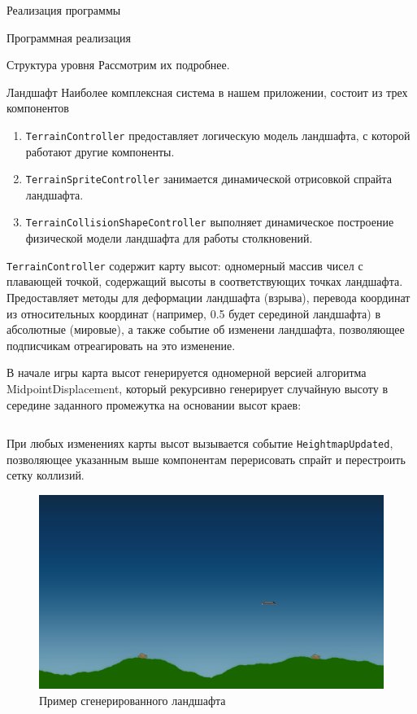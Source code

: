 \documentclass[a4paper, 14pt]{extarticle}
\begin{document}
\begin{section}{Реализация программы}
\begin{subsection}{Программная реализация}
\begin{subsubsection}{Структура уровня}
Рассмотрим их подробнее.
\end{subsubsection}

\begin{subsubsection}{Ландшафт}
Наиболее комплексная система в нашем приложении, состоит из трех компонентов
\begin{enumerate}
\item \verb|TerrainController| предоставляет логическую модель ландшафта, с которой работают другие компоненты.
\item \verb|TerrainSpriteController| занимается динамической отрисовкой спрайта ландшафта.
\item \verb|TerrainCollisionShapeController| выполняет динамическое построение физической модели ландшафта для работы столкновений.
\end{enumerate}

\verb|TerrainController| содержит карту высот: одномерный массив чисел с плавающей точкой, содержащий высоты в соответствующих точках ландшафта.
Предоставляет методы для деформации ландшафта (взрыва), перевода координат из относительных координат (например, 0.5 будет серединой ландшафта) в абсолютные (мировые), а также событие об изменени ландшафта, позволяющее подписчикам отреагировать на это изменение.

В начале игры карта высот генерируется одномерной версией алгоритма MidpointDisplacement, который рекурсивно генерирует случайную высоту в середине заданного промежутка на основании высот краев:
\clearpage
\inputminted{cpp}{listings/MidpointDisplacement1D.cpp}

При любых изменениях карты высот вызывается событие \verb|HeightmapUpdated|, позволяющее указанным выше компонентам перерисовать спрайт и перестроить сетку коллизий.

\begin{figure}[h]
\includegraphics[width=\linewidth]{terrain}
\caption{Пример сгенерированного ландшафта}
\end{figure}
\end{subsubsection}


\end{subsection}
\end{section}
\end{document}
